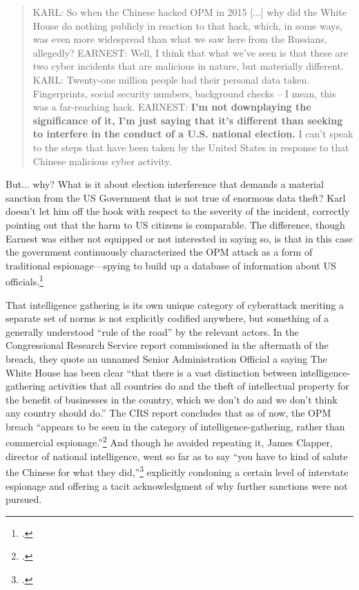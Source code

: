 \documentclass{report}
\begin{document}
\begin{refsegment}
\begin{quote}
KARL: So when the Chinese hacked OPM in 2015 [...] why did the White House do nothing publicly in reaction to that hack, which, in some ways, was even more widespread than what we saw here from the Russians, allegedly?
\newline \newline
EARNEST: Well, I think that what we've seen is that these are two cyber incidents that are malicious in nature, but materially different.
\newline \newline
KARL: Twenty-one million people had their personal data taken.  Fingerprints, social security numbers, background checks -- I mean, this was a far-reaching hack.
\newline \newline
EARNEST: \textbf{I'm not downplaying the significance of it, I'm just saying that it's different than seeking to interfere in the conduct of a U.S. national election.} I can't speak to the steps that have been taken by the United States in response to that Chinese malicious cyber activity.
\end{quote}

But... why? What is it about election interference that demands a material sanction from the US Government that is not true of enormous data theft? Karl doesn't let him off the hook with respect to the severity of the incident, correctly pointing out that the harm to US citizens is comparable. The difference, though Earnest was either not equipped or not interested in saying so, is that in this case the government continuously characterized the OPM attack as a form of traditional espionage---spying to build up a database of information about US officials.\footcite{nakashima_chinese_2015}

That intelligence gathering is its own unique category of cyberattack meriting a separate set of norms is not explicitly codified anywhere, but something of a generally understood ``rule of the road'' by the relevant actors. In the Congressional Research Service report commissioned in the aftermath of the breach, they quote an unnamed Senior Administration Official a saying The White House has been clear ``that there is a vast distinction between intelligence-gathering activities that all countries do and the theft of intellectual property for the benefit of businesses in the country, which we don’t do and we don’t think any country should do.'' The CRS report concludes that as of now, the OPM breach ``appears to be seen in the category of intelligence-gathering, rather than commercial espionage.''\footcite{finklea_cyber_2015} And though he avoided repeating it, James Clapper, director of national intelligence, went so far as to say ``you have to kind of salute the Chinese for what they did,''\footcite{sanger_u.s._2015} explicitly condoning a certain level of interstate espionage and offering a tacit acknowledgment of why further sanctions were not pursued.


\end{refsegment}
\end{document}
